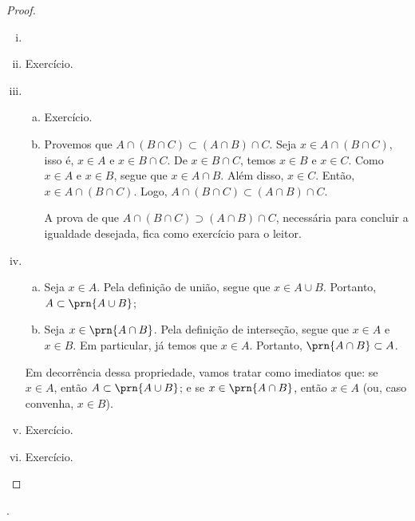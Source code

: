 \begin{proof}
\begin{enumerate}[i)]
\item[]
\item Exercício.
\item
	\begin{enumerate}[a)]
		\item 
		Exercício.

		\item
		Provemos que $A \cap (B \cap C) \subset (A \cap B) \cap C$. 
		Seja $x \in A \cap (B \cap C)$, isso é, $x \in A$ e $x \in B \cap C$.
		De $x \in B \cap C$, temos $x \in B$ e $x \in C$.
		Como $x \in A$ e $x \in B$, segue que $x \in A \cap B$.
		Além disso, $x \in C$.
		Então, $x \in A \cap (B \cap C)$.
		Logo, $A \cap (B \cap C) \subset (A \cap B) \cap C$. 

		A prova de que $A \cap (B \cap C) \supset (A \cap B) \cap C$, necessária para concluir a igualdade desejada, fica como exercício para o leitor.

	\end{enumerate}

\item 	
	\begin{enumerate}[a)]
		\item Seja $x \in A$. Pela definição de união, segue que $x \in A \cup B$. Portanto, $A \subset \prn{A \cup B}$;
		\item Seja $x \in \prn{A \cap B}$. Pela definição de interseção, segue que $x\in A$ e $x \in B$. 
		Em particular, já temos que $x \in A$. Portanto, $\prn{A \cap B} \subset A$.
	\end{enumerate}
	Em decorrência dessa propriedade, vamos tratar como imediatos que: 
	se $x \in A$, então $A \subset \prn{A \cup B}$; 
	e se $x \in \prn{A \cap B}$, então $x\in A$ (ou, caso convenha, $x\in B$).
\item Exercício.
\item Exercício.
\end{enumerate}
\end{proof}

\begin{onlineact}
.
\end{onlineact}


